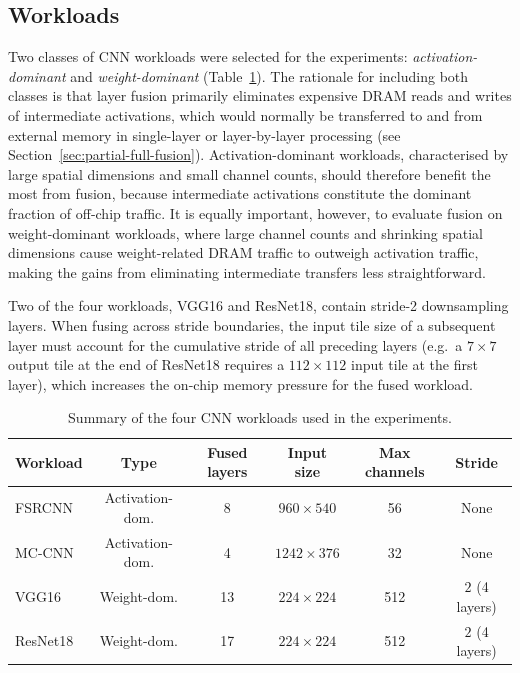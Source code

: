 \subsection{Workloads}
\label{sec:workloads}

Two classes of CNN workloads were selected for the experiments:
\emph{activation-dominant} and \emph{weight-dominant}
(Table~\ref{tab:workloads}).
The rationale for including both classes is that layer fusion
primarily eliminates expensive DRAM reads and writes of intermediate
activations, which would normally be transferred to and from external
memory in single-layer or layer-by-layer processing
(see Section~\ref{sec:partial-full-fusion}).
Activation-dominant workloads, characterised by large spatial dimensions
and small channel counts, should therefore benefit the most from fusion,
because intermediate activations constitute the dominant fraction of
off-chip traffic.
It is equally important, however, to evaluate fusion on weight-dominant
workloads, where large channel counts and shrinking spatial dimensions
cause weight-related DRAM traffic to outweigh activation traffic,
making the gains from eliminating intermediate transfers less
straightforward.

Two of the four workloads, VGG16 and ResNet18, contain stride-2
downsampling layers.
When fusing across stride boundaries, the input tile size of a
subsequent layer must account for the cumulative stride of all
preceding layers (e.g.\ a $7 \times 7$ output tile at the end of
ResNet18 requires a $112 \times 112$ input tile at the first layer),
which increases the on-chip memory pressure for the fused workload.

\begin{table}[htbp]
  \centering
  \caption{Summary of the four CNN workloads used in the experiments.}
  \label{tab:workloads}
  \small
  \begin{tabular}{l c c c c c}
    \toprule
    \textbf{Workload}
      & \textbf{Type}
      & \textbf{Fused layers}
      & \textbf{Input size}
      & \textbf{Max channels}
      & \textbf{Stride} \\
    \midrule
    FSRCNN~\cite{fsrcnn_paper}
      & Activation-dom.
      & 8
      & $960 \times 540$
      & 56
      & None \\
    MC-CNN~\cite{mccnn_paper}
      & Activation-dom.
      & 4
      & $1242 \times 376$
      & 32
      & None \\
    VGG16~\cite{vgg_paper}
      & Weight-dom.
      & 13
      & $224 \times 224$
      & 512
      & $2$ (4 layers) \\
    ResNet18~\cite{resnet_paper}
      & Weight-dom.
      & 17
      & $224 \times 224$
      & 512
      & $2$ (4 layers) \\
    \bottomrule
  \end{tabular}
\end{table}

